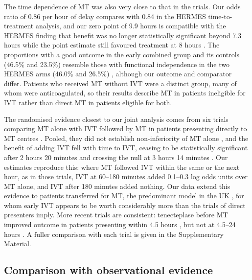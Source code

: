 The time dependence of MT was also very close to that in the trials. Our odds ratio of 0.86 per hour of delay compares with 0.84 in the HERMES time-to-treatment analysis, and our zero point of 9.9 hours is compatible with the HERMES finding that benefit was no longer statistically significant beyond 7.3 hours while the point estimate still favoured treatment at 8 hours \cite{saver2016}. The proportions with a good outcome in the early combined group and its controls (46.5\% and 23.5\%) resemble those with functional independence in the two HERMES arms (46.0\% and 26.5\%) \cite{goyal2016}, although our outcome and comparator differ. Patients who received MT without IVT were a distinct group, many of whom were anticoagulated, so their results describe MT in patients ineligible for IVT rather than direct MT in patients eligible for both.

The randomised evidence closest to our joint analysis comes from six trials comparing MT alone with IVT followed by MT in patients presenting directly to MT centres \cite{yang2020,zi2021,suzuki2021,lecouffe2021,fischer2022,mitchell2022}. Pooled, they did not establish non-inferiority of MT alone \cite{majoie2023}, and the benefit of adding IVT fell with time to IVT, ceasing to be statistically significant after 2 hours 20 minutes and crossing the null at 3 hours 14 minutes \cite{kaesmacher2024}. Our estimates reproduce this: where MT followed IVT within the same or the next hour, as in those trials, IVT at 60--180 minutes added 0.1--0.3 log odds units over MT alone, and IVT after 180 minutes added nothing. Our data extend this evidence to patients transferred for MT, the predominant model in the UK \cite{allen2022}, for whom early IVT appears to be worth considerably more than the trials of direct presenters imply. More recent trials are consistent: tenecteplase before MT improved outcome in patients presenting within 4.5 hours \cite{qiu2025}, but not at 4.5--24 hours \cite{tnkplus2026}. A fuller comparison with each trial is given in the Supplementary Material.

\subsection{Comparison with observational evidence}


